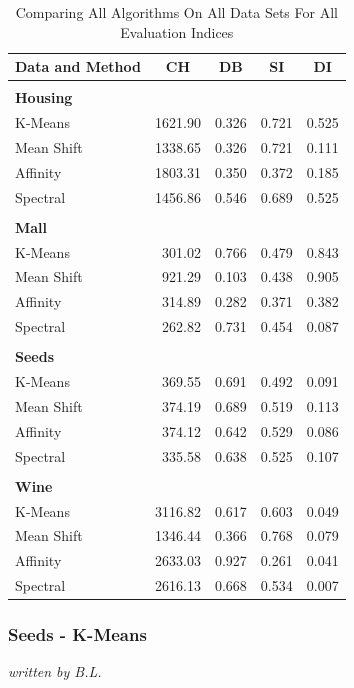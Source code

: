 \begin{table}[H]
\begin{center}
\begin{tabular}{lrrrr}
Data and Method & \multicolumn{1}{c}{\gls{CH}} & \multicolumn{1}{c}{\gls{DB}} & \multicolumn{1}{c}{\gls{SI}} & \multicolumn{1}{c}{\gls{DI}} \\ \hline
 &  &  &  &  \\
\textbf{Housing} &  &  &  & \\
K-Means & 1621.90 & 0.326 & 0.721 & 0.525 \\
Mean Shift & 1338.65 & 0.326 & 0.721 & 0.111 \\
Affinity & 1803.31 & 0.350 & 0.372 & 0.185 \\
Spectral & 1456.86 & 0.546 & 0.689 & 0.525 \\
 &  &  &  &  \\
\textbf{Mall} &  &  &  &  \\
K-Means & 301.02 & 0.766 & 0.479 & 0.843 \\
Mean Shift & 921.29 & 0.103 & 0.438 & 0.905 \\
Affinity & 314.89 & 0.282 & 0.371 & 0.382 \\
Spectral & 262.82 & 0.731 & 0.454 & 0.087 \\
 &  &  &  &  \\
\textbf{Seeds} &  &  &  &  \\
K-Means & 369.55 & 0.691 & 0.492 & 0.091 \\
Mean Shift & 374.19 & 0.689 & 0.519 & 0.113 \\
Affinity & 374.12 & 0.642 & 0.529 & 0.086 \\
Spectral & 335.58 & 0.638 & 0.525 & 0.107 \\
 &  &  &  &  \\
\textbf{Wine} &  &  &  &  \\
K-Means & 3116.82 & 0.617 & 0.603 & 0.049 \\
Mean Shift & 1346.44 & 0.366 & 0.768 & 0.079 \\
Affinity & 2633.03 & 0.927 & 0.261 & 0.041 \\
Spectral & 2616.13 & 0.668 & 0.534 & 0.007
\end{tabular}%
\end{center}
\caption{Comparing All Algorithms On All Data Sets For All Evaluation Indices}
\label{tab:evalutaion_table}
\end{table}


\subsubsection{Seeds - K-Means}
\textit{written by B.L.}\\
\label{sec:seeds_kmeans_evaluation}

